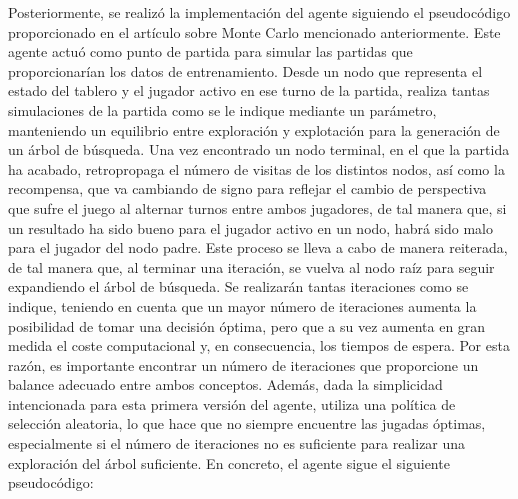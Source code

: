 \documentclass[conference,a4paper]{IEEEtran}
\begin{document}
Posteriormente, se realizó la implementación del agente siguiendo el pseudocódigo proporcionado en el artículo sobre Monte Carlo mencionado anteriormente. 
Este agente actuó como punto de partida para simular las partidas que proporcionarían los datos de entrenamiento. Desde un nodo que representa el estado del tablero 
y el jugador activo en ese turno de la partida, realiza tantas simulaciones de la partida como se le indique mediante un parámetro, manteniendo un equilibrio entre exploración y 
explotación para la generación de un árbol de búsqueda. Una vez encontrado un nodo terminal, en el que la partida ha acabado, retropropaga 
el número de visitas de los distintos nodos, así como la recompensa, que va cambiando de signo para reflejar el cambio de perspectiva que 
sufre el juego al alternar turnos entre ambos jugadores, de tal manera que, si un resultado ha sido bueno para el jugador activo en un nodo,
habrá sido malo para el jugador del nodo padre. Este proceso se lleva a cabo de manera reiterada, de tal manera que, al terminar una iteración, 
se vuelva al nodo raíz para seguir expandiendo el árbol de búsqueda. Se realizarán tantas iteraciones como se indique, teniendo en cuenta que 
un mayor número de iteraciones aumenta la posibilidad de tomar una decisión óptima, pero que a su vez aumenta en gran medida el coste computacional y, 
en consecuencia, los tiempos de espera. Por esta razón, es importante encontrar un número de iteraciones que proporcione un balance adecuado 
entre ambos conceptos. Además, dada la simplicidad intencionada para esta primera versión del agente, utiliza una política de selección aleatoria, 
lo que hace que no siempre encuentre las jugadas óptimas, especialmente si el número de iteraciones no es suficiente para realizar una 
exploración del árbol suficiente. En concreto, el agente sigue el siguiente pseudocódigo:
\end{document}
